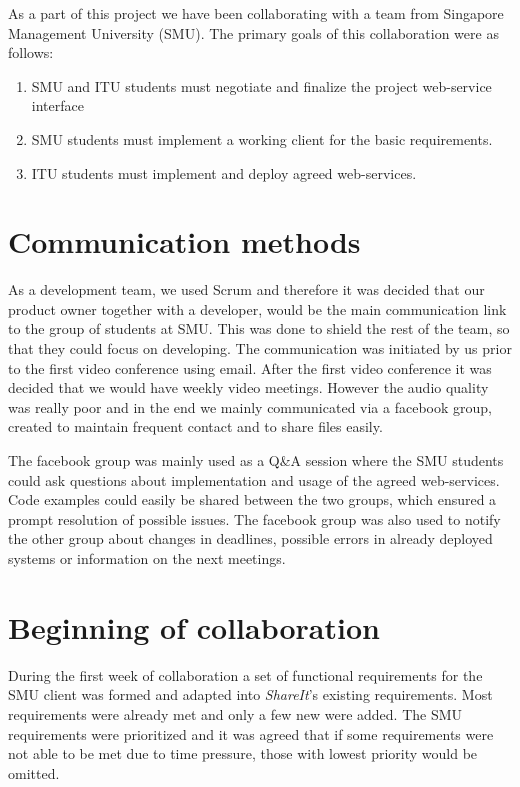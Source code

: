 \documentclass[../report.tex]{subfiles}
\begin{document}
\graphicspath{{img/}{../img/}}

As a part of this project we have been collaborating with a team from Singapore Management University (SMU). The primary goals\cite{SMU-Wiki-1} of this collaboration were as follows:

\begin{enumerate}[label=\bfseries G\arabic*:]
\item SMU and ITU students must negotiate and finalize the project web-service interface
\item SMU students must implement a working client for the basic requirements.
\item ITU students must implement and deploy agreed web-services.
\end{enumerate}

\section{Communication methods}
As a development team, we used Scrum and therefore it was decided that our product owner together with a developer, would be the main communication link to the group of students at SMU.
This was done to shield the rest of the team, so that they could focus on developing.
The communication was initiated by us prior to the first video conference using email.
After the first video conference it was decided that we would have weekly video meetings.
However the audio quality was really poor and in the end we mainly communicated via a facebook group, created to maintain frequent contact and to share files easily.

The facebook group was mainly used as a Q\&A session where the SMU students could ask questions about implementation and usage of the agreed web-services. Code examples could easily be shared between the two groups, which ensured a prompt resolution of possible issues. The facebook group was also used to notify the other group about changes in deadlines, possible errors in already deployed systems or information on the next meetings.


\section{Beginning of collaboration}
During the first week of collaboration a set of functional requirements for the SMU client was formed and adapted into \textit{ShareIt}'s existing requirements. 
Most requirements were already met and only a few new were added. 
The SMU requirements were prioritized and it was agreed that if some requirements were not able to be met due to time pressure, those with lowest priority would be omitted.
\end{document}
